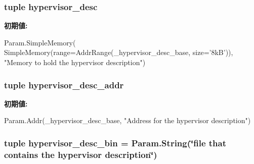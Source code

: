 \hypertarget{classSparcSystem_1_1SparcSystem_a87ab875c63de4f4118f5e123be062cd2}{
\subsubsection[{hypervisor\_\-desc}]{\setlength{\rightskip}{0pt plus 5cm}tuple {\bf hypervisor\_\-desc}}}
\label{classSparcSystem_1_1SparcSystem_a87ab875c63de4f4118f5e123be062cd2}
{\bfseries 初期値:}
\begin{DoxyCode}
Param.SimpleMemory(
        SimpleMemory(range=AddrRange(_hypervisor_desc_base, size='8kB')),
        "Memory to hold the hypervisor description")
\end{DoxyCode}
\hypertarget{classSparcSystem_1_1SparcSystem_abf580feb0b7f92c3c748176835bc0626}{
\subsubsection[{hypervisor\_\-desc\_\-addr}]{\setlength{\rightskip}{0pt plus 5cm}tuple hypervisor\_\-desc\_\-addr}}
\label{classSparcSystem_1_1SparcSystem_abf580feb0b7f92c3c748176835bc0626}
{\bfseries 初期値:}
\begin{DoxyCode}
Param.Addr(_hypervisor_desc_base,
            "Address for the hypervisor description")
\end{DoxyCode}
\hypertarget{classSparcSystem_1_1SparcSystem_a07e6b2d2275f41491b1c95fd0a4641b2}{
\subsubsection[{hypervisor\_\-desc\_\-bin}]{\setlength{\rightskip}{0pt plus 5cm}tuple hypervisor\_\-desc\_\-bin = Param.String(\char`\"{}file that contains the {\bf hypervisor} description\char`\"{})}}
